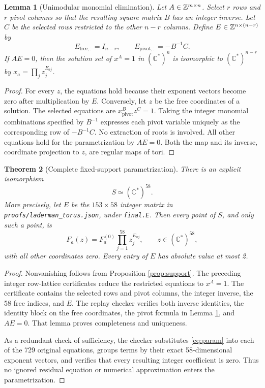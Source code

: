 \documentclass[11pt,letterpaper]{article}
\newtheorem{theorem}{Theorem}[section]
\newtheorem{lemma}[theorem]{Lemma}
\theoremstyle{definition}\newtheorem{definition}[theorem]{Definition}
\theoremstyle{remark}\newtheorem{remark}[theorem]{Remark}
\newcommand{\Cstar}{\mathbb C^{\!*}}
\newcommand{\file}[1]{\nolinkurl{#1}}
\begin{document}
\begin{lemma}[Unimodular monomial elimination]\label{lem:unimod}
Let $A\in\mathbb Z^{m\times n}$. Select $r$ rows and $r$ pivot columns so that
the resulting square matrix $B$ has an integer inverse. Let $C$ be the
selected rows restricted to the other $n-r$ columns. Define
$E\in\mathbb Z^{n\times(n-r)}$ by
\[
 E_{\mathrm{free},:}=I_{n-r},\qquad
 E_{\mathrm{pivot},:}=-B^{-1}C.
\]
If $AE=0$, then the solution set of $x^A=1$ in $(\Cstar)^n$ is
isomorphic to $(\Cstar)^{n-r}$ by $x_a=\prod_j z_j^{E_{aj}}$.
\end{lemma}
\begin{proof}
For every $z$, the equations hold because their exponent vectors become
zero after multiplication by $E$. Conversely, let $z$ be the free
coordinates of a solution. The selected equations are
$x_{\mathrm{pivot}}^Bz^C=1$. Taking the integer monomial combinations
specified by $B^{-1}$ expresses each pivot variable uniquely as the
corresponding row of $-B^{-1}C$. No extraction of roots is involved.
All other equations hold for the parametrization by $AE=0$.
Both the map and its inverse, coordinate projection to $z$, are regular
maps of tori.
\end{proof}

\begin{theorem}[Complete fixed-support parametrization]\label{thm:torus}
There is an explicit isomorphism
\[
 S\simeq (\Cstar)^{58}.
\]
More precisely, let $E$ be the $153\times58$ integer matrix in
\file{proofs/laderman_torus.json}, under \file{final.E}. Then every point
of $S$, and only such a point, is
\begin{equation}\label{eq:param}
 F_a(z)=F_a^{(0)}\prod_{j=1}^{58}z_j^{E_{aj}},\qquad
 z\in(\Cstar)^{58},
\end{equation}
with all other coordinates zero. Every entry of $E$ has absolute value
at most 2.
\end{theorem}
\begin{proof}
Nonvanishing follows from Proposition \ref{prop:support}. The preceding
integer row-lattice certificates reduce the restricted equations to
$x^A=1$. The certificate contains the selected rows and pivot columns,
the integer inverse, the 58 free indices, and $E$. The replay checker
verifies both inverse identities, the identity block on the free
coordinates, the pivot formula in Lemma \ref{lem:unimod}, and $AE=0$.
That lemma proves completeness and uniqueness.

As a redundant check of sufficiency, the checker substitutes
\eqref{eq:param} into each of the 729 original equations, groups terms
by their exact 58-dimensional exponent vectors, and verifies that every
resulting integer coefficient is zero. Thus no ignored residual equation
or numerical approximation enters the parametrization.
\end{proof}
\end{document}
